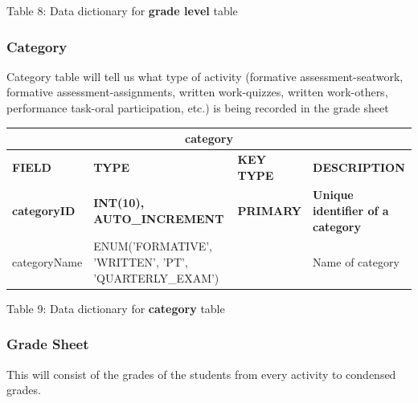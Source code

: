 \documentclass[11pt,a4paper,titlepage]{article}
\begin{document}
\vspace{.5cm}
\begin{center}
    Table 8: Data dictionary for \textbf{grade level} table
\end{center}

\newpage

\subsubsection{Category}

Category table will tell us what type of activity (formative assessment-seatwork, formative assessment-assignments, written work-quizzes, written work-others, performance task-oral participation, etc.) is being recorded in the grade sheet

\vspace{1cm}
\begin{longtable}{ |p{2.5cm}|p{4.5cm}|p{2.5cm}|p{3cm}|  }
    \hline
    \multicolumn{4}{|c|}{\textbf{category}} \\
    \hline
    \textbf{FIELD}&\textbf{TYPE}&\textbf{KEY TYPE}&\textbf{DESCRIPTION}\\
    \hline
    \textbf{categoryID}  & \textbf{INT(10), AUTO\_INCREMENT} & \textbf{PRIMARY} & \textbf{Unique identifier of a category}\\ \hline
    categoryName & ENUM('FORMATIVE', 'WRITTEN', 'PT', 'QUARTERLY\_EXAM') & & Name of category \\ \hline
\end{longtable}

\vspace{.5cm}
\begin{center}
    Table 9: Data dictionary for \textbf{category} table
\end{center}

\newpage

\subsubsection{Grade Sheet}

This will consist of the grades of the students from every activity to condensed grades.
\end{document}
